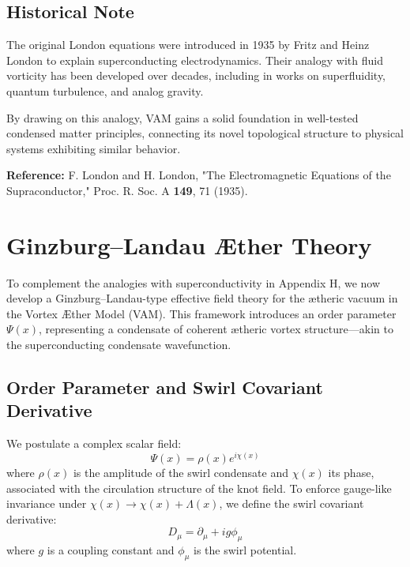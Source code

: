 \documentclass[a4paper,12pt]{article}
\begin{document}
        \subsection{Historical Note}
        The original London equations were introduced in 1935 by Fritz and Heinz London to explain superconducting electrodynamics. Their analogy with fluid vorticity has been developed over decades, including in works on superfluidity, quantum turbulence, and analog gravity.

        By drawing on this analogy, VAM gains a solid foundation in well-tested condensed matter principles, connecting its novel topological structure to physical systems exhibiting similar behavior.

        \bigskip

        \noindent \textbf{Reference:} F. London and H. London, "The Electromagnetic Equations of the Supraconductor," Proc. R. Soc. A \textbf{149}, 71 (1935).

\section{Ginzburg--Landau Æther Theory}
        To complement the analogies with superconductivity in Appendix H, we now develop a Ginzburg--Landau-type effective field theory for the ætheric vacuum in the Vortex Æther Model (VAM). This framework introduces an order parameter $\Psi(x)$, representing a condensate of coherent ætheric vortex structure---akin to the superconducting condensate wavefunction.

        \subsection{Order Parameter and Swirl Covariant Derivative}
        We postulate a complex scalar field:
        \begin{equation}
            \Psi(x) = \rho(x) e^{i\chi(x)}
        \end{equation}
        where $\rho(x)$ is the amplitude of the swirl condensate and $\chi(x)$ its phase, associated with the circulation structure of the knot field. To enforce gauge-like invariance under $\chi(x) \rightarrow \chi(x) + \Lambda(x)$, we define the swirl covariant derivative:
        \begin{equation}
            D_\mu = \partial_\mu + i g \phi_\mu
        \end{equation}
        where $g$ is a coupling constant and $\phi_\mu$ is the swirl potential.
\end{document}
